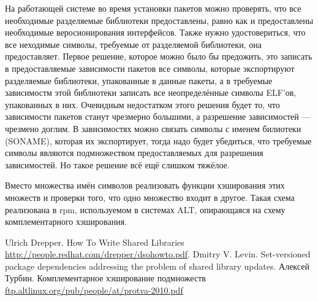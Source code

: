 \documentclass[10pt, a5paper]{article}
\begin{document}
На работающей системе во время установки пакетов можно проверять, что все необходимые разделяемые библиотеки предоставлены, равно как и предоставлены необходимые веросионирования интерфейсов. Также нужно удостовериться, что все неходимые символы, требуемые от разделяемой библиотеки, она предоставляет. Первое решение, которое можно было бы предожить, это записать в предоставляемые зависимости пакетов все символы, которые  экспортируют разделяемые библиотеки, упакованные в данные пакеты, а в требуемые зависимостм этой библиотеки записать все неопределённые символы ELF'ов, упакованных в них. Очевидным недостатком этого решения будет то, что зависимости пакетов станут чрезмерно большими, а разрешение зависимостей --- чрезмено доглим. В зависимостях можно связать символы с именем билиотеки (SONAME), которая их экспортирует, тогда надо будет убедиться, что требуемые символы являются подмножеством предоставляемых для разрешения зависимостей. Но такое решение всё ещё слишком тяжёлое.

Вместо множества имён символов реализовать функции хэширования этих множеств и проверки того, что одно множество входит в другое. Такая схема реализована в rpm, используемом в системах ALT, опирающаяся на схему комплементарного хэширования.


\begin{thebibliography}{99}
   Ulrich Drepper. How To Write Shared Libraries \url{http://people.redhat.com/drepper/dsohowto.pdf}.
   Dmitry V. Levin. Set-versioned package dependencies addressing the problem of shared library updates.
  Алексей Турбин. Комплементарное хэширование подмножеств \url{ftp.altlinux.org/pub/people/at/protva-2010.pdf}
\end{thebibliography}
\end{document}
